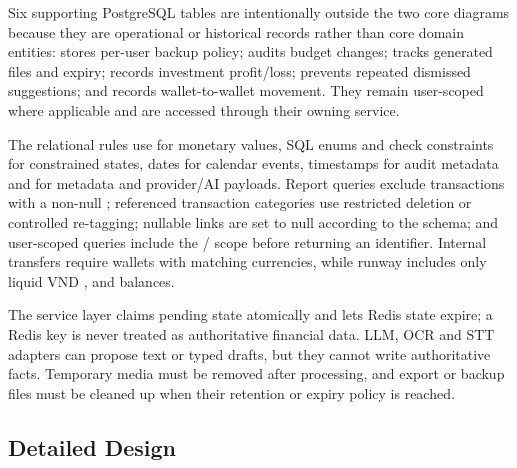 Six supporting PostgreSQL tables are intentionally outside the two core diagrams because they are operational or historical records rather than core domain entities:  stores per-user backup policy;  audits budget changes;  tracks generated files and expiry;  records investment profit/loss;  prevents repeated dismissed suggestions; and  records wallet-to-wallet movement. They remain user-scoped where applicable and are accessed through their owning service.

The relational rules use  for monetary values, SQL enums and check constraints for constrained states, dates for calendar events, timestamps for audit metadata and  for metadata and provider/AI payloads. Report queries exclude transactions with a non-null ; referenced transaction categories use restricted deletion or controlled re-tagging; nullable links are set to null according to the schema; and user-scoped queries include the / scope before returning an identifier. Internal transfers require wallets with matching currencies, while runway includes only liquid VND ,  and  balances.

The service layer claims pending state atomically and lets Redis state expire; a Redis key is never treated as authoritative financial data. LLM, OCR and STT adapters can propose text or typed drafts, but they cannot write authoritative facts. Temporary media must be removed after processing, and export or backup files must be cleaned up when their retention or expiry policy is reached.

\subsection{Detailed Design}
\label{subsec:detailed-design}


